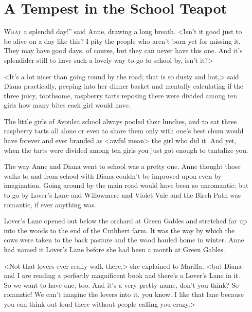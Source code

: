 \chapter{A Tempest in the School Teapot}

\lettrine[ante=“,]{W}{hat} a splendid day!” said Anne, drawing a long breath. <Isn't it good just to be alive on a day like this? I pity the people who aren't born yet for missing it. They may have good days, of course, but they can never have this one. And it's splendider still to have such a lovely way to go to school by, isn't it?>

<It's a lot nicer than going round by the road; that is so dusty and hot,> said Diana practically, peeping into her dinner basket and mentally calculating if the three juicy, toothsome, raspberry tarts reposing there were divided among ten girls how many bites each girl would have.

The little girls of Avonlea school always pooled their lunches, and to eat three raspberry tarts all alone or even to share them only with one's best chum would have forever and ever branded as <awful mean> the girl who did it. And yet, when the tarts were divided among ten girls you just got enough to tantalize you.

The way Anne and Diana went to school was a pretty one. Anne thought those walks to and from school with Diana couldn't be improved upon even by imagination. Going around by the main road would have been so unromantic; but to go by Lover's Lane and Willowmere and Violet Vale and the Birch Path was romantic, if ever anything was.

Lover's Lane opened out below the orchard at Green Gables and stretched far up into the woods to the end of the Cuthbert farm. It was the way by which the cows were taken to the back pasture and the wood hauled home in winter. Anne had named it Lover's Lane before she had been a month at Green Gables.

<Not that lovers ever really walk there,> she explained to Marilla, <but Diana and I are reading a perfectly magnificent book and there's a Lover's Lane in it. So we want to have one, too. And it's a very pretty name, don't you think? So romantic! We can't imagine the lovers into it, you know. I like that lane because you can think out loud there without people calling you crazy.>

